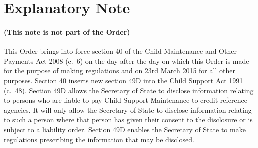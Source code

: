 \documentclass[12pt,a4paper]{article}
\begin{document}
\small

\part{Explanatory Note}

\renewcommand\parthead{— Explanatory Note}

\subsection*{(This note is not part of the Order)}

This Order brings into force section 40 of the Child Maintenance and Other Payments Act 2008 (c.~6) on the day after the day on which this Order is made for the purpose of making regulations and on 23rd March 2015 for all other purposes. Section 40 inserts new section 49D into the Child Support Act 1991 (c.~48). Section 49D allows the Secretary of State to disclose information relating to persons who are liable to pay Child Support Maintenance to credit reference agencies. It will only allow the Secretary of State to disclose information relating to such a person where that person has given their consent to the disclosure or is subject to a liability order. Section 49D enables the Secretary of State to make regulations prescribing the information that may be disclosed. 
\end{document}
